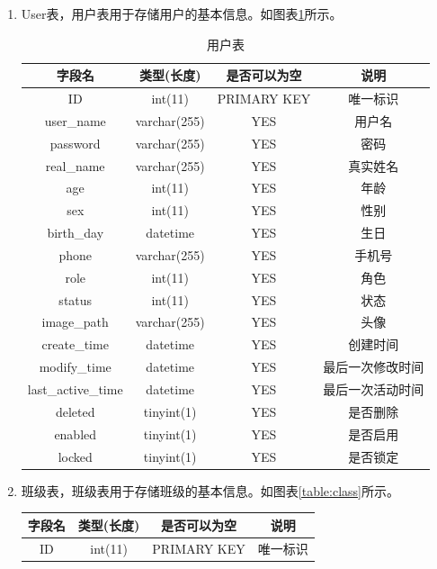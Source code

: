 \begin{enumerate}
	\item[(1)] User表，用户表用于存储用户的基本信息。如图表\ref{table:user}所示。
	\begin{table}[!htbp]
		\centering
		\begin{tabular}{|c|c|c|c|}
			\hline
			字段名 & 类型(长度) & 是否可以为空 & 说明 \\
			\hline
			ID & int(11) & PRIMARY KEY & 唯一标识 \\
			\hline
			user\_name & varchar(255) & YES & 用户名 \\
			\hline
			password & varchar(255) & YES & 密码 \\
			\hline
			real\_name & varchar(255) & YES & 真实姓名 \\
			\hline
			age & int(11) & YES	 & 年龄 \\
			\hline
			sex & int(11) & YES & 性别 \\
			\hline
			birth\_day & datetime & YES & 生日 \\
			\hline
			phone & varchar(255) & YES & 手机号 \\
			\hline
			role & int(11) & YES & 角色 \\
			\hline
			status & int(11) & YES & 状态 \\
			\hline
			image\_path & varchar(255) & YES & 头像 \\
			\hline
			create\_time & datetime & YES & 创建时间 \\
			\hline
			modify\_time & datetime & YES & 最后一次修改时间 \\
			\hline
			last\_active\_time & datetime & YES & 最后一次活动时间 \\
			\hline
			deleted & tinyint(1) & YES & 是否删除 \\
			\hline
			enabled & tinyint(1) & YES & 是否启用 \\
			\hline
			locked & tinyint(1) & YES & 是否锁定 \\
			\hline
		\end{tabular}
		\caption{用户表}
		\label{table:user}
	\end{table}
	\item[(2)] 班级表，班级表用于存储班级的基本信息。如图表\ref{table:class}所示。
	\begin{table}[!htbp]
		\centering
		\begin{tabular}{|c|c|c|c|}
			\hline
			字段名 & 类型(长度) & 是否可以为空 & 说明 \\
			\hline
			ID & int(11) & PRIMARY KEY & 唯一标识 \\

\end{tabular}
\end{table}
\end{enumerate}
